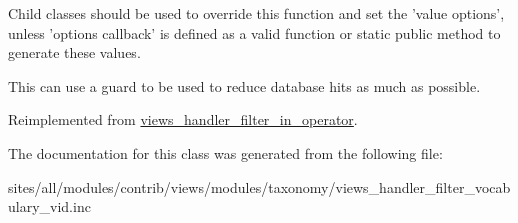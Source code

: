 Child classes should be used to override this function and set the 'value options', unless 'options callback' is defined as a valid function or static public method to generate these values.

This can use a guard to be used to reduce database hits as much as possible. 

Reimplemented from \hyperlink{classviews__handler__filter__in__operator_a5b5df6d90f4359ed28c0c446bdc81a6}{views\_\-handler\_\-filter\_\-in\_\-operator}.

The documentation for this class was generated from the following file:\begin{CompactItemize}
\item 
sites/all/modules/contrib/views/modules/taxonomy/views\_\-handler\_\-filter\_\-vocabulary\_\-vid.inc\end{CompactItemize}
